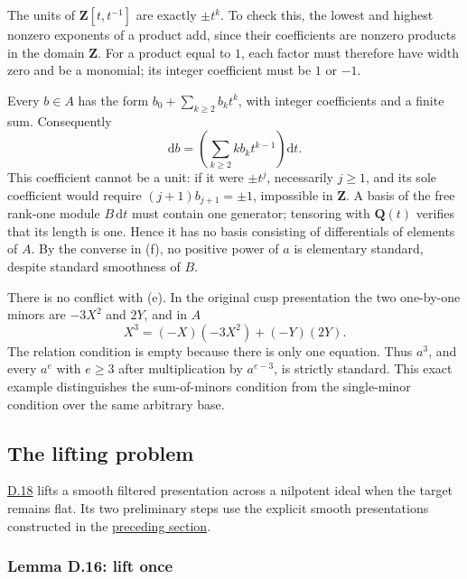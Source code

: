 \documentclass[11pt,a4paper,openany]{report}
\begin{document}
The units of \(\mathbf Z[t,t^{-1}]\) are exactly \(\pm t^k\). To check this, the lowest and highest nonzero exponents of a product add, since their coefficients are nonzero products in the domain \(\mathbf Z\). For a product equal to \(1\), each factor must therefore have width zero and be a monomial; its integer coefficient must be \(1\) or \(-1\).

Every \(b\in A\) has the form \(b_0+\sum_{k\ge2}b_k t^k\), with integer coefficients and a finite sum. Consequently \[\mathrm db=\left(\sum_{k\ge2}k b_k t^{k-1}\right)\mathrm dt.\] This coefficient cannot be a unit: if it were \(\pm t^j\), necessarily \(j\ge1\), and its sole coefficient would require \((j+1)b_{j+1}=\pm1\), impossible in \(\mathbf Z\). A basis of the free rank-one module \(B\,\mathrm dt\) must contain one generator; tensoring with \(\mathbf Q(t)\) verifies that its length is one. Hence it has no basis consisting of differentials of elements of \(A\). By the converse in (f), no positive power of \(a\) is elementary standard, despite standard smoothness of \(B\).

There is no conflict with (e). In the original cusp presentation the two one-by-one minors are \(-3X^2\) and \(2Y\), and in \(A\) \[X^3=(-X)(-3X^2)+(-Y)(2Y).\] The relation condition is empty because there is only one equation. Thus \(a^3\), and every \(a^e\) with \(e\ge3\) after multiplication by \(a^{e-3}\), is strictly standard. This exact example distinguishes the sum-of-minors condition from the single-minor condition over the same arbitrary base.

\subsection{The lifting problem}\label{AG-RG-S05-the-lifting-problem}

\label{AG-RG-S05-smoothing-section-lifting}

\hyperref[AG-RG-S05-smoothing-proposition-lift]{D.18} lifts a smooth filtered presentation across a nilpotent ideal when the target remains flat. Its two preliminary steps use the explicit smooth presentations constructed in the \hyperref[AG-RG-S05-smoothing-section-presentations]{preceding section}.

\label{AG-RG-S05-smoothing-lemma-lift-once}

\subsubsection{Lemma D.16: lift once}\label{AG-RG-S05-lemma-d.16-lift-once}
\end{document}
